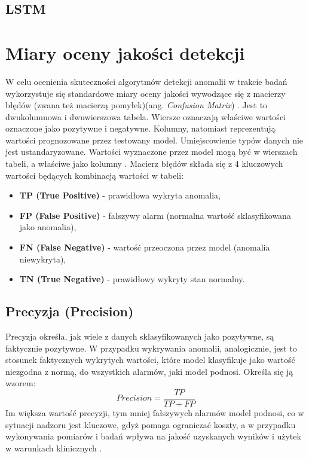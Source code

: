 \documentclass[a4paper,twoside,12pt]{book}
\newcommand{\obcy}[1]{\emph{#1}}
\newcommand{\english}[1]{{\selectlanguage{british}\obcy{#1}}}
\begin{document}
\subsection{LSTM}



\section{Miary oceny jakości detekcji}

W celu ocenienia skuteczności algorytmów detekcji anomalii w trakcie badań wykorzystuje się standardowe miary oceny jakości wywodzące się z macierzy błędów (zwana też macierzą pomyłek)(ang. \english{Confusion Matrix}) \cite{yang2024confusion}. Jest to dwukolumnowa i dwuwierszowa tabela. Wiersze oznaczają właściwe wartości oznaczone jako pozytywne i negatywne. Kolumny, natomiast reprezentują wartości prognozowane przez testowany model. Umiejscowienie typów danych nie jest ustandaryzowane. Wartości wyznaczone przez model mogą być w wierszach tabeli, a właściwe jako kolumny \cite{yang2024confusion}. Macierz błędów składa się z 4 kluczowych wartości będących kombinacją wartości w tabeli:
 \begin{itemize}
 	\item \textbf{TP (True Positive)} - prawidłowa wykryta anomalia,
 	\item \textbf{FP (False  Positive)} - fałszywy alarm (normalna wartość sklasyfikowana jako anomalia),
 	\item \textbf{FN (False Negative)} - wartość przeoczona przez model (anomalia niewykryta),
 	\item \textbf{TN (True Negative)} - prawidłowy wykryty stan normalny.
 \end{itemize}

\subsection{Precyzja (Precision)}
Precyzja określa, jak wiele z danych sklasyfikowanych jako pozytywne, są faktycznie pozytywne. W przypadku wykrywania anomalii, analogicznie, jest to stosunek faktycznych wykrytych wartości, które model klasyfikuje jako wartość niezgodna z normą, do wszystkich alarmów, jaki model podnosi. Określa się ją wzorem:
\begin{equation}
	Precision = \frac{TP}{TP + FP}
	\label{eq:precision}
\end{equation} 
Im większa wartość precyzji, tym mniej fałszywych alarmów model podnosi, co w sytuacji nadzoru jest kluczowe, gdyż pomaga ograniczać koszty, a w przypadku wykonywania pomiarów i badań wpływa na jakość uzyskanych wyników i użytek w warunkach klinicznych \cite{yang2024confusion}.
\end{document}
